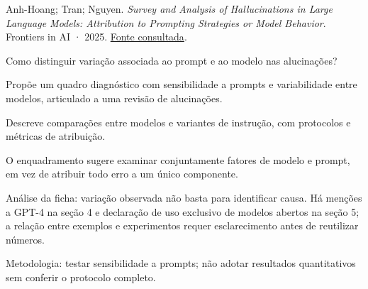{\small Anh-Hoang; Tran; Nguyen. \textit{Survey and Analysis of Hallucinations in Large Language Models: Attribution to Prompting Strategies or Model Behavior}. Frontiers in AI · 2025. \href{https://www.frontiersin.org/journals/artificial-intelligence/articles/10.3389/frai.2025.1622292/pdf}{Fonte consultada}.\par}

Como distinguir variação associada ao prompt e ao modelo nas alucinações?

Propõe um quadro diagnóstico com sensibilidade a prompts e variabilidade entre modelos, articulado a uma revisão de alucinações.

Descreve comparações entre modelos e variantes de instrução, com protocolos e métricas de atribuição.

O enquadramento sugere examinar conjuntamente fatores de modelo e prompt, em vez de atribuir todo erro a um único componente.

\begin{itemize}
\end{itemize}

Análise da ficha: variação observada não basta para identificar causa. Há menções a GPT-4 na seção 4 e declaração de uso exclusivo de modelos abertos na seção 5; a relação entre exemplos e experimentos requer esclarecimento antes de reutilizar números.

Metodologia: testar sensibilidade a prompts; não adotar resultados quantitativos sem conferir o protocolo completo.

